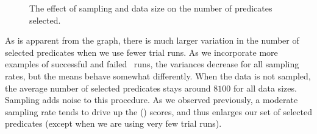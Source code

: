\begin{figure}
  \hspace{\columnsep}
  \caption{The effect of sampling and data size on the number of
  predicates selected.}
  \label{fig-predkept}
\end{figure}

As is apparent from the graph, there is much larger variation in the
number of selected predicates when we use fewer trial runs.
As we incorporate more examples of successful and failed \moss\ runs,
the variances decrease for all sampling rates, but the means behave
somewhat differently.  When the data is not sampled, the average
number of selected predicates stays around $8100$ for all data sizes.
Sampling adds noise to this procedure.  As we observed previously,
a moderate sampling rate tends to drive up the \increase() scores, and
thus enlarges our set of selected predicates (except when we are using
very few trial runs).

